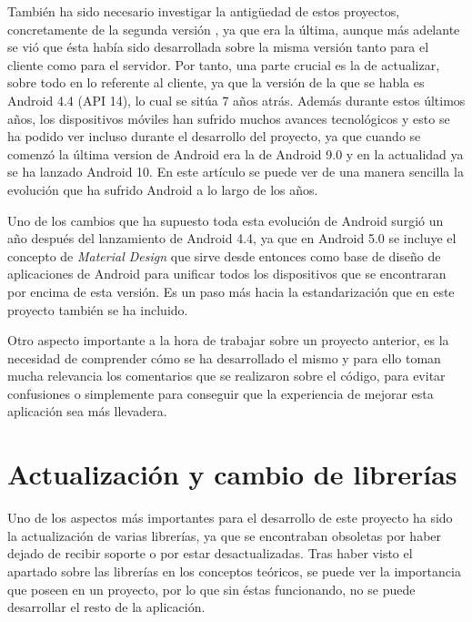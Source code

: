 También ha sido necesario investigar la antigüedad de estos proyectos, concretamente de la segunda versión \cite{tfm1}, ya que era la última, aunque más adelante se vió que ésta había sido desarrollada sobre la misma versión tanto para el cliente como para el servidor. Por tanto, una parte crucial es la de actualizar, sobre todo en lo referente al cliente, ya que la versión de la que se habla es Android 4.4 (API 14), lo cual se sitúa 7 años atrás. Además durante estos últimos años, los dispositivos móviles han sufrido muchos avances tecnológicos y esto se ha podido ver incluso durante el desarrollo del proyecto, ya que cuando se comenzó la última version de Android era la de Android 9.0 y en la actualidad ya se ha lanzado Android 10. En este artículo \cite{and1} se puede ver de una manera sencilla la evolución que ha sufrido Android a lo largo de los años.

Uno de los cambios que ha supuesto toda esta evolución de Android surgió un año después del lanzamiento de Android 4.4, ya que en Android 5.0 se incluye el concepto de \textit{Material Design} que sirve desde entonces como base de diseño de aplicaciones de Android para unificar todos los dispositivos que se encontraran por encima de esta versión. Es un paso más hacia la estandarización que en este proyecto también se ha incluido.

Otro aspecto importante a la hora de trabajar sobre un proyecto anterior, es la necesidad de comprender cómo se ha desarrollado el mismo y para ello toman mucha relevancia los comentarios que se realizaron sobre el código, para evitar confusiones o simplemente para conseguir que la experiencia de mejorar esta aplicación sea más llevadera.



\section{Actualización y cambio de librerías}

Uno de los aspectos más importantes para el desarrollo de este proyecto ha sido la actualización de varias librerías, ya que se encontraban obsoletas por haber dejado de recibir soporte o por estar desactualizadas. Tras haber visto el apartado sobre las librerías en los conceptos teóricos, se puede ver la importancia que poseen en un proyecto, por lo que sin éstas funcionando, no se puede desarrollar el resto de la aplicación.

